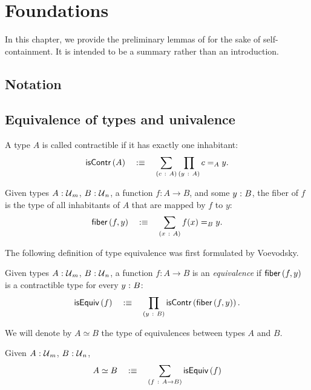 \chapter{Foundations}\label{chap:foundations}

In this chapter, we provide the preliminary lemmas of \UF{} for the sake of
self-containment. It is intended to be a summary rather than an introduction.

\section{Notation}

\section{Equivalence of types and univalence}

\begin{defn}[Contractible]
  A type $A$ is called contractible if it has exactly one inhabitant:
  \begin{equation*}
    \mathsf{isContr}\left(A\right) \quad:\equiv\quad \sum_{(c~:~A)} \prod_{(y~:~A)} c =_A y.
  \end{equation*}
\end{defn}

\begin{defn}[Fiber]
  Given types $A\hspace{0.1mm}:\hspace{0.1mm}\mathcal{U}{}_m$, $B\hspace{0.1mm}:\hspace{0.1mm}\mathcal{U}{}_n$, a function
  $f : A \rightarrow B$, and some $y\hspace{0.1mm}:\hspace{0.1mm}B$, the fiber of $f$ is the type of all inhabitants
  of $A$ that are mapped by $f$ to $y$:
  \begin{equation*}
    \mathsf{fiber}\left(f, y\right) \quad:\equiv\quad \sum_{(x~:~A)} f(x) =_B y.
  \end{equation*}
\end{defn}

The following definition of type equivalence was first formulated by Voevodsky.
\begin{defn}\label{defn:equiv}
  Given types $A\hspace{0.1mm}:\hspace{0.1mm}\mathcal{U}{}_m$, $B\hspace{0.1mm}:\hspace{0.1mm}\mathcal{U}{}_n$, a function $f : A \rightarrow B$ is an
  \emph{equivalence} if $\mathsf{fiber}\left(f, y\right)$ is a contractible type for every $y\hspace{0.1mm}:\hspace{0.1mm}B$:
  \begin{equation*}
    \mathsf{isEquiv}\left(f\right) \quad:\equiv\quad \prod_{(y~:~B)} \mathsf{isContr}\left(\mathsf{fiber}\left(f, y\right)\right).
  \end{equation*}
\end{defn}

We will denote by $A \simeq B$ the type of equivalences between types $A$ and $B$.
\begin{defn}
  Given $A\hspace{0.1mm}:\hspace{0.1mm}\mathcal{U}{}_m$, $B\hspace{0.1mm}:\hspace{0.1mm}\mathcal{U}{}_n$,
  \begin{equation*}
    A \simeq B \quad:\equiv\quad \sum_{(f~:~A \rightarrow B)} \mathsf{isEquiv}\left(f\right)
  \end{equation*}
\end{defn}


